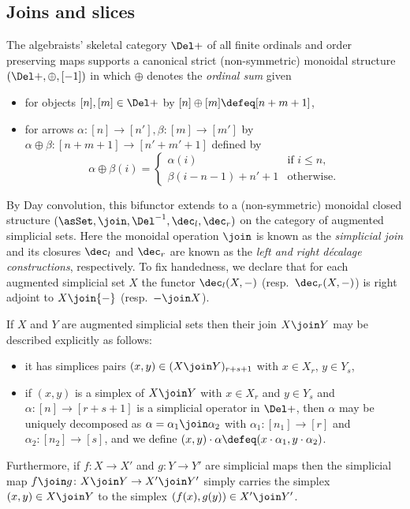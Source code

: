   \subsection{Joins and slices}\label{subsec:join}

  \begin{rec}\label{rec:join-dec} The algebraists' skeletal category $\Del+$ of all finite ordinals and order preserving maps supports a canonical strict (non-symmetric) monoidal structure $(\Del+,\oplus,[-1])$ in which $\oplus$ denotes the {\em ordinal sum\/} given 
  \begin{itemize}
    \item for objects $[n],[m]\in\Del+$ by $[n]\oplus[m] \defeq [n+m+1]$,
    \item for arrows $\alpha\colon[n]\to[n'], \beta\colon[m]\to[m']$ by $\alpha\oplus\beta\colon[n+m+1]\to[n'+m'+1]$ defined by
  \begin{equation*}
    \alpha\oplus\beta(i) =
    \begin{cases}
    \alpha(i)& \text{if $i\leq n$,} \\
    \beta(i-n-1) + n' + 1& \text{otherwise.}
    \end{cases}
  \end{equation*}
  \end{itemize}
By Day convolution, this bifunctor extends to a (non-symmetric) monoidal closed structure $(\asSet, \join, \Del^{-1}, \dec_l, \dec_r)$ on the category of augmented simplicial sets. Here the monoidal operation $\join$ is known as the {\em simplicial join\/} and its closures $\dec_l$ and $\dec_r$ are known as the {\em left and right d{\'e}calage constructions}, respectively.   To fix handedness, we declare that for each augmented simplicial set $X$ the functor $\dec_l(X,{-})$ (resp.\ $\dec_r(X,{-})$) is right adjoint to $X\join{-}$ (resp.\ ${-}\join X$).

  If $X$ and $Y$ are augmented simplicial sets then their join $X\join Y$ may be described explicitly as follows:
  \begin{itemize}
    \item it has simplices pairs $(x,y) \in (X\join Y)_{r+s+1}$ with $x\in X_r$, $y\in Y_s$,
    \item if $(x,y)$ is a simplex of $X\join Y$ with $x \in X_r$ and $y \in Y_s$ and $\alpha\colon[n]\to[r+s+1]$ is a simplicial operator in $\Del+$, then $\alpha$ may be uniquely decomposed as $\alpha=\alpha_1\join\alpha_2$ with $\alpha_1\colon[n_1]\to[r]$ and $\alpha_2\colon[n_2]\to[s]$, and we define $(x,y)\cdot\alpha\defeq (x\cdot\alpha_1,y\cdot\alpha_2)$. 
  \end{itemize}
  Furthermore, if $f\colon X\to X'$ and $g\colon Y\to Y'$ are simplicial maps then the simplicial map $f\join g\colon X\join Y\to X'\join Y'$ simply carries the simplex $(x,y)\in X\join Y$ to the simplex $(f(x),g(y))\in X'\join Y'$. 
  \end{rec}

